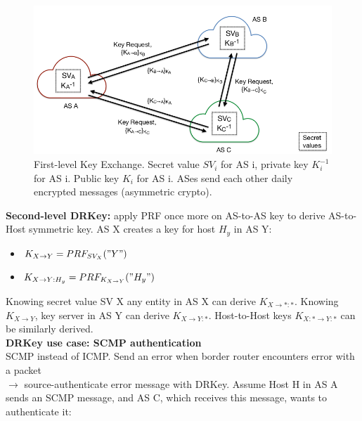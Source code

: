 \documentclass[11pt,oneside,a4paper]{article}
\begin{document}
\newpage

\begin{figure}
	\centering
	\includegraphics[width=0.7\linewidth]{figures/drkey_firstlevel_key_exchange}
	\caption{First-level Key Exchange. Secret value $SV_i$ for AS i, private key $K_i^{-1}$ for AS i. Public key $K_i$ for AS i. ASes send each other daily encrypted messages (asymmetric crypto).}
	\label{fig:drkeyfirstlevelkeyexchange}
\end{figure}

\textbf{Second-level DRKey:} apply PRF once more on AS-to-AS key to derive AS-to-Host symmetric key. AS X creates a key for host $H_y$ in AS Y:

\vspace{-\topsep}
\begin{itemize}
	\setlength{\itemsep}{0pt}
	\setlength{\parskip}{0pt}
	\item $K_{X\rightarrow Y} = PRF_{SV_X}("Y")$
	\item $K_{X\rightarrow Y:H_y} = PRF_{K_{X\rightarrow Y}}("H_y")$
\end{itemize}
\vspace{-\topsep}

Knowing secret value SV X any entity in AS X can derive $K_{X\rightarrow *:*}$. Knowing $K_{X\rightarrow Y}$, key server in AS Y can derive $K_{X\rightarrow Y:*}$. Host-to-Host keys $K_{X:*\rightarrow Y:*}$ can be similarly derived.\\

\textbf{DRKey use case: SCMP authentication}\\

SCMP instead of ICMP. Send an error when border router encounters error with a packet\\ $\rightarrow$ source-authenticate error message with DRKey. Assume Host H in AS A sends an SCMP message, and AS C, which receives this message, wants to authenticate it:
\end{document}
